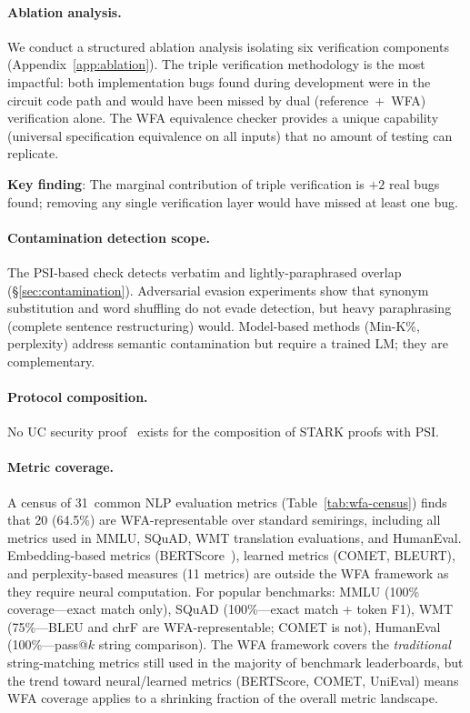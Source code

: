 \documentclass[11pt]{article}
\begin{document}
\paragraph{Ablation analysis.}
We conduct a structured ablation analysis isolating six verification
components (Appendix~\ref{app:ablation}).  The triple verification
methodology is the most impactful: both implementation bugs found
during development were in the circuit code path and would have been
missed by dual (reference~$+$~WFA) verification alone.
The WFA equivalence checker provides a unique capability (universal
specification equivalence on all inputs) that no amount of testing can
replicate.

\noindent\textbf{Key finding}: The marginal contribution of triple
verification is $+2$ real bugs found; removing any single verification
layer would have missed at least one bug.

\paragraph{Contamination detection scope.}
The PSI-based check detects verbatim and lightly-paraphrased overlap
(\S\ref{sec:contamination}).  Adversarial evasion experiments show
that synonym substitution and word shuffling do not evade detection,
but heavy paraphrasing (complete sentence restructuring) would.
Model-based methods (Min-K\%, perplexity) address semantic
contamination but require a trained LM; they are complementary.

\paragraph{Protocol composition.}
No UC security proof~\cite{canetti2001uc} exists for the composition
of STARK proofs with PSI.

\paragraph{Metric coverage.}
A census of 31~common NLP evaluation metrics (Table~\ref{tab:wfa-census})
finds that 20 (64.5\%) are WFA-representable over standard semirings,
including all metrics used in MMLU, SQuAD, WMT translation evaluations,
and HumanEval.  Embedding-based metrics (BERTScore~\cite{zhang2020bertscore}),
learned metrics (COMET, BLEURT), and perplexity-based measures (11 metrics)
are outside the WFA framework as they require neural computation.
For popular benchmarks: MMLU (100\% coverage---exact match only),
SQuAD (100\%---exact match + token F1), WMT (75\%---BLEU and chrF
are WFA-representable; COMET is not), HumanEval (100\%---pass@$k$
string comparison).  The WFA framework covers the \emph{traditional}
string-matching metrics still used in the majority of benchmark leaderboards,
but the trend toward neural/learned metrics (BERTScore, COMET, UniEval)
means WFA coverage applies to a shrinking fraction of the overall
metric landscape.
\end{document}
